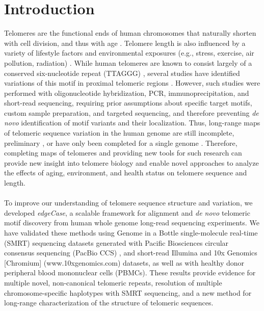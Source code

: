 \documentclass{article}
\begin{document}
\section*{Introduction} 
    Telomeres are the functional ends of human chromosomes that naturally shorten with cell division, and thus with age \parencite{teloaging}.
    Telomere length is also influenced by a variety of lifestyle factors and environmental exposures
        (e.g., stress, exercise, air pollution, radiation) \parencite{teloeffects}.
    While human telomeres are known to consist largely of a conserved six-nucleotide repeat (TTAGGG) \parencite{moyzis},
        several studies have identified variations of this motif in proximal telomeric regions
            \parencite{telovars1989,telovars1999,telovars2018,telovars2019}.
    However, such studies were performed with oligonucleotide hybridization, PCR, immunoprecipitation, and short-read sequencing,
        requiring prior assumptions about specific target motifs, custom sample preparation, and targeted sequencing,
        and therefore preventing \textit{de novo} identification of motif variants and their localization.
    Thus, long-range maps of telomeric sequence variation in the human genome are still incomplete, preliminary \parencite{shafin},
        or have only been completed for a single genome \parencite{jain,t2t}.
    Therefore, completing maps of telomeres and providing new tools for such research \parencite{nurk} can provide new insight into
        telomere biology and enable novel approaches to analyze the effects of aging, environment, and health status \parencite{telovars2018}
        on telomere sequence and length.
    \\~\\
    To improve our understanding of telomere sequence structure and variation, we developed \textit{edgeCase},
        a scalable framework for alignment and \textit{de novo} telomeric motif discovery
        from human whole genome long-read sequencing experiments.
    We have validated these methods using
        Genome in a Bottle \parencite{giab} single-molecule real-time (SMRT) sequencing datasets
            generated with Pacific Biosciences circular consensus sequencing (PacBio CCS) \parencite{pacbio,pacbioccs},
        and short-read Illumina \parencite{illumina} and 10x Genomics [Chromium] (www.10xgenomics.com) datasets,
        as well as with healthy donor peripheral blood mononuclear cells (PBMCs).
    These results provide evidence for
        multiple novel, non-canonical telomeric repeats,
        resolution of multiple chromosome-specific haplotypes with SMRT sequencing,
        and a new method for long-range characterization of the structure of telomeric sequences.
\end{document}
